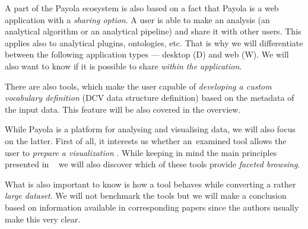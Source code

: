 A part of the Payola ecosystem is also based on a fact that Payola is a web 
application with a \emph{sharing option}. A user is able to make an analysis (an
analytical algorithm or an analytical pipeline) and share it with other users. This applies also to 
analytical plugins, ontologies, etc. That is why we will differentiate between the following
application types --- desktop (D) and web (W). We will also want to 
know if it is possible to share \emph{within the application}.

There are also tools, which make the user capable of \emph{developing a custom vocabulary 
definition} (DCV data structure definition) based on the metadata of the input data.
This feature will be also covered in the overview.

While Payola is a platform for analysing and visualising data, we will also 
focus on the latter. First of all, it interests us whether 
an~examined tool allows the user to \emph{prepare a visualization} . While keeping 
in mind the main principles presented in ~\cite{mantra} we will also discover 
which of these tools provide \emph{faceted browsing}.

What is also important to know is how a tool behaves while converting a rather 
\emph{large dataset}. We will not benchmark the tools but we will make a conclusion based 
on information available in corresponding papers since the authors usually make 
this very clear.

\vspace{0.5cm}

